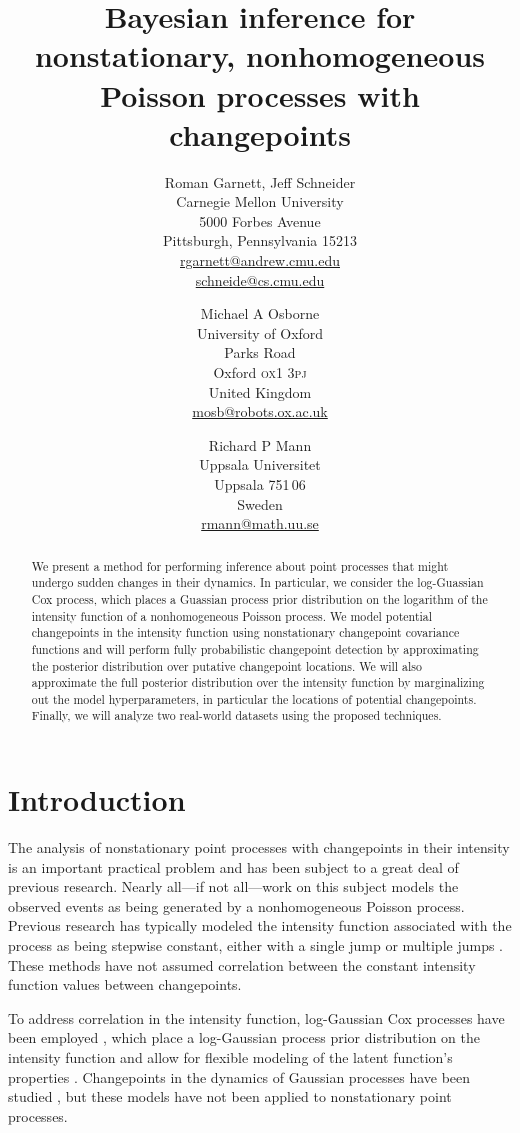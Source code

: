 \documentclass{article}
\title{Bayesian inference for nonstationary, nonhomogeneous Poisson
  processes with changepoints}
\author{
  Roman Garnett, Jeff Schneider\\
  {Carnegie Mellon University}\\
  {5000 Forbes Avenue}\\
  {Pittsburgh, Pennsylvania 15213}\\
  \url{rgarnett@andrew.cmu.edu}\\
  \url{schneide@cs.cmu.edu}
  \and
  Michael A Osborne\\
  {University of Oxford}\\
  {Parks Road}\\
  {Oxford \textsc{ox}1 3\textsc{pj}}\\
  {United Kingdom}\\
  \url{mosb@robots.ox.ac.uk}
  \and
  Richard P Mann\\
  {Uppsala Universitet}\\
  {Uppsala 751\,06}\\
  {Sweden}\\
  \url{rmann@math.uu.se}
}
\begin{document}
\maketitle

\begin{abstract}
  We present a method for performing inference about point processes
  that might undergo sudden changes in their dynamics.  In particular,
  we consider the log-Guassian Cox process, which places a Guassian
  process prior distribution on the logarithm of the intensity
  function of a nonhomogeneous Poisson process.  We model potential
  changepoints in the intensity function using nonstationary
  changepoint covariance functions and will perform fully
  probabilistic changepoint detection by approximating the posterior
  distribution over putative changepoint locations.  We will also
  approximate the full posterior distribution over the intensity
  function by marginalizing out the model hyperparameters, in
  particular the locations of potential changepoints.  Finally, we
  will analyze two real-world datasets using the proposed techniques.
\end{abstract}

\section{Introduction}

The analysis of nonstationary point processes with changepoints in
their intensity is an important practical problem and has been subject
to a great deal of previous research.  Nearly all---if not all---work
on this subject models the observed events as being generated by a
nonhomogeneous Poisson process.  Previous research has typically
modeled the intensity function associated with the process as being
stepwise constant, either with a single jump \citep{rafteryakman,
  carlin, westogden} or multiple jumps \citep{youngkuo, fearnhead,
  adamscp}.  These methods have not assumed correlation between the
constant intensity function values between changepoints.

To address correlation in the intensity function, log-Gaussian Cox
processes have been employed \citep{moller}, which place a
log-Gaussian process prior distribution on the intensity function and
allow for flexible modeling of the latent function's properties
\citep{gpml}.  Changepoints in the dynamics of Gaussian processes have
been studied \citep{cpcj, bocpd}, but these models have not been
applied to nonstationary point processes.
\end{document}
